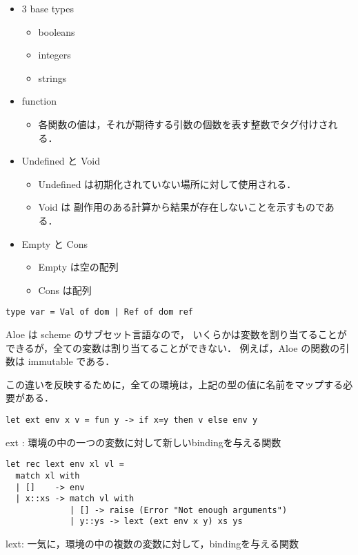 \documentclass[10pt,a4paper]{jarticle}
\theoremstyle{definition}
\begin{document}
  \begin{itemize}
  \item 3 base types
    \begin{itemize}
    \item booleans
    \item integers
    \item strings
    \end{itemize}
  \item function
    \begin{itemize}
    \item 各関数の値は，それが期待する引数の個数を表す整数でタグ付けされる．
    \end{itemize}
  \item Undefined と Void
    \begin{itemize}
    \item Undefined は初期化されていない場所に対して使用される．
    \item Void は 副作用のある計算から結果が存在しないことを示すものである．
    \end{itemize}
  \item Empty と Cons
    \begin{itemize}
    \item Empty は空の配列
    \item Cons は配列
    \end{itemize}
  \end{itemize}

{\small
\begin{verbatim}
type var = Val of dom | Ref of dom ref
\end{verbatim}}
Aloe は scheme のサブセット言語なので，
いくらかは変数を割り当てることができるが，全ての変数は割り当てることができない．
例えば，Aloe の関数の引数は immutable である．

この違いを反映するために，全ての環境は，上記の型の値に名前をマップする必要がある．

{\small
\begin{verbatim}
let ext env x v = fun y -> if x=y then v else env y
\end{verbatim}}
ext : 環境の中の一つの変数に対して新しいbindingを与える関数

{\small
\begin{verbatim}
let rec lext env xl vl =
  match xl with
  | []    -> env
  | x::xs -> match vl with
             | [] -> raise (Error "Not enough arguments")
             | y::ys -> lext (ext env x y) xs ys
\end{verbatim}}
lext: 一気に，環境の中の複数の変数に対して，bindingを与える関数
\end{document}
